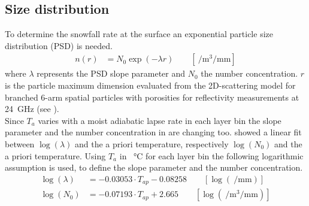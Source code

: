 \subsection{Size distribution} \label{sec:size_dist}
To determine the snowfall rate at the surface an exponential particle size distribution (PSD) is needed. 
\begin{align}
	n(r) & = N_{0} \exp\left(-\lambda r\right) \qquad [ \SI{}{\per\cubic\metre\per\mm} ] \label{eq:num_dens}
\end{align}
where $\lambda$ represents the PSD slope parameter and $N_{0}$ the number concentration. $r$ is the particle maximum dimension evaluated from the 2D-scattering model for branched 6-arm spatial particles with porosities for reflectivity measurements at \SI{24}{\giga\Hz} (see ).
\\
Since $T_{a}$ varies with a moist adiabatic lapse rate in each layer bin the slope parameter and the number concentration in  are changing too. \citet{wood_estimation_2011} showed a linear fit between $\log(\lambda)$ and the a priori temperature, respectively $\log(N_0)$ and the a priori temperature.
Using $T_{a}$ in \SI{}{\celsius} for each layer bin the following logarithmic assumption is used, to define the slope parameter and the number concentration.
\begin{align}
	\log(\lambda) & = -0.03053 \cdot T_{ap} - 0.08258  \label{eq:lambda} \qquad [ \log(\SI{}{\per\mm}) ]\\
	\log(N_0) & = -0.07193 \cdot T_{ap} +2.665  \qquad [ \log(\SI{}{\per\cubic\metre\per\mm})]
	\label{eq:N0}
\end{align}
